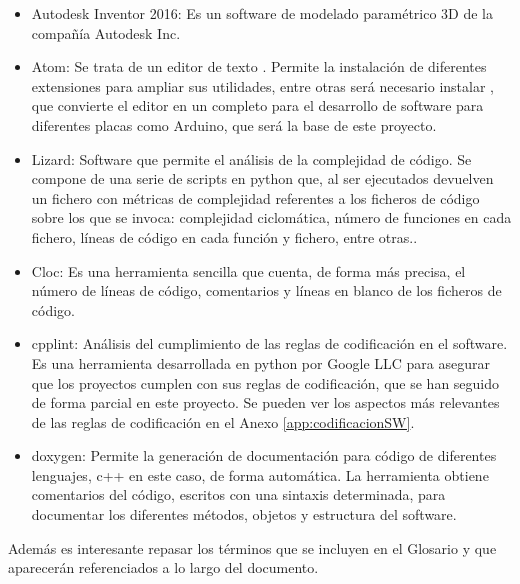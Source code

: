 \begin{itemize}
    \item Autodesk Inventor 2016: Es un software de modelado paramétrico 3D de la compañía Autodesk Inc.
    \item Atom: Se trata de un editor de texto . Permite la instalación de diferentes extensiones para ampliar sus utilidades, entre otras será necesario instalar , que convierte el editor en un  completo para el desarrollo de software para diferentes placas como Arduino, que será la base de este proyecto.
    \item Lizard: Software que permite el análisis de la complejidad de código. Se compone de una serie de scripts en python que, al ser ejecutados devuelven un fichero con métricas de complejidad referentes a los ficheros de código sobre los que se invoca: complejidad ciclomática, número de funciones en cada fichero, líneas de código en cada función y fichero, entre otras..
    \item Cloc: Es una herramienta sencilla que cuenta, de forma más precisa, el número de líneas de código, comentarios y líneas en blanco de los ficheros de código.
    \item cpplint: Análisis del cumplimiento de las reglas de codificación en el software. Es una herramienta desarrollada en python por Google LLC para asegurar que los proyectos cumplen con sus reglas de codificación, que se han seguido de forma parcial en este proyecto. Se pueden ver los aspectos más relevantes de las reglas de codificación en el Anexo \ref{app:codificacionSW}.
    \item doxygen: Permite la generación de documentación para código de diferentes lenguajes, c++ en este caso, de forma automática. La herramienta obtiene comentarios del código, escritos con una sintaxis determinada, para documentar los diferentes métodos, objetos y estructura del software.
\end{itemize}

Además es interesante repasar los términos que se incluyen en el Glosario y que aparecerán referenciados a lo largo del documento. \completar
